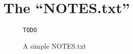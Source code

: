 \documentclass[english,10pt]{scrbook}
\begin{document}
\section{The \enquote{NOTES.txt}}
\lipsum[2-4] 

\begin{figure}[h]
\begin{verbatim}
TODO
\end{verbatim}
\caption{A simple NOTES.txt}\label{code:NOTES.txt}
\end{figure}
\clearpage

\cleardoublepage
\appendix
\printglossaries

\nocite{*}
\printbibliography[heading=bibintoc,title={Sources}]

\listoffigures
\end{document}
